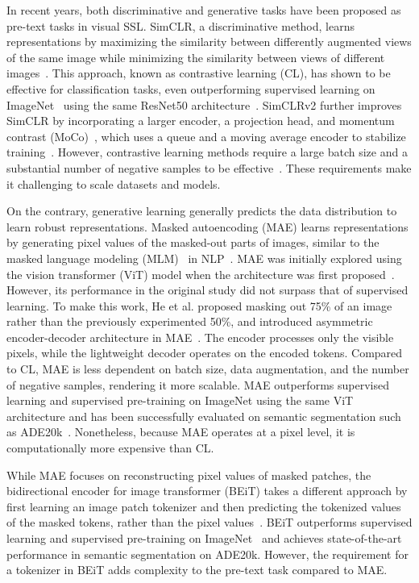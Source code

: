 \documentclass[a4paper,11pt,oneside]{report}
\begin{document}
In recent years, both discriminative and generative tasks have been proposed as pre-text tasks in visual SSL. SimCLR, a discriminative method, learns representations by maximizing the similarity between differently augmented views of the same image while minimizing the similarity between views of different images~\cite{Chen2020Simple}. This approach, known as contrastive learning (CL), has shown to be effective for classification tasks, even outperforming supervised learning on ImageNet~\cite{Russakovsky2015} using the same ResNet50 architecture~\cite{He2016}. SimCLRv2 further improves SimCLR by incorporating a larger encoder, a projection head, and momentum contrast (MoCo)~\cite{He2020}, which uses a queue and a moving average encoder to stabilize training~\cite{Chen2020}. However, contrastive learning methods require a large batch size and a substantial number of negative samples to be effective~\cite{Chen2020Simple}. These requirements make it challenging to scale datasets and models.

On the contrary, generative learning generally predicts the data distribution to learn robust representations. Masked autoencoding (MAE) learns representations by generating pixel values of the masked-out parts of images, similar to the masked language modeling (MLM)~\cite{Devlin2019} in NLP~\cite{He2022}. MAE was initially explored using the vision transformer (ViT) model when the architecture was first proposed~\cite{Dosovitskiy2020vit}. However, its performance in the original study did not surpass that of supervised learning. To make this work, He et al. proposed masking out 75\% of an image rather than the previously experimented 50\%, and introduced asymmetric encoder-decoder architecture in MAE~\cite{He2022}. The encoder processes only the visible pixels, while the lightweight decoder operates on the encoded tokens. Compared to CL, MAE is less dependent on batch size, data augmentation, and the number of negative samples, rendering it more scalable. MAE outperforms supervised learning and supervised pre-training on ImageNet using the same ViT architecture and has been successfully evaluated on semantic segmentation such as ADE20k~\cite{Zhou2018}. Nonetheless, because MAE operates at a pixel level, it is computationally more expensive than CL.

While MAE focuses on reconstructing pixel values of masked patches, the bidirectional encoder for image transformer (BEiT) takes a different approach by first learning an image patch tokenizer and then predicting the tokenized values of the masked tokens, rather than the pixel values~\cite{Bao2022beit}. BEiT outperforms supervised learning and supervised pre-training on ImageNet~\cite{Russakovsky2015} and achieves state-of-the-art performance in semantic segmentation on ADE20k. However, the requirement for a tokenizer in BEiT adds complexity to the pre-text task compared to MAE. 
\end{document}
